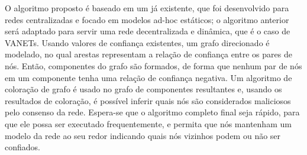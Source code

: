 \begin{resumo}
O algoritmo proposto é baseado em um já existente, que foi desenvolvido para redes centralizadas e focado em modelos ad-hoc estáticos; o algoritmo anterior será adaptado para servir uma rede decentralizada e dinâmica, que é o caso de VANETs.
Usando valores de confiança existentes, um grafo direcionado é modelado, no qual arestas representam a relação de confiança entre os pares de nós.
Então, componentes do grafo são formados, de forma que nenhum par de nós em um componente tenha uma relação de confiança negativa.
Um algoritmo de coloração de grafo é usado no grafo de componentes resultantes e, usando os resultados de coloração, é possível inferir quais nós são considerados maliciosos pelo consenso da rede.
Espera-se que o algoritmo completo final seja rápido, para que ele possa ser executado frequentemente, e permita que nós mantenham um modelo da rede ao seu redor indicando quais nós vizinhos podem ou não ser confiados.

\end{resumo}

